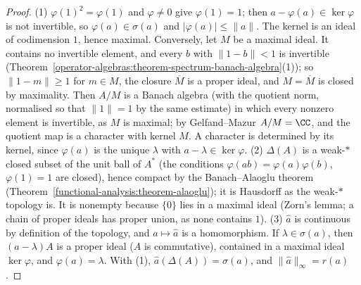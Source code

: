 \begin{proof}
(1) $\varphi(1)^2 = \varphi(1)$ and $\varphi \neq 0$ give $\varphi(1) = 1$; then $a - \varphi(a) \in \ker\varphi$ is not invertible, so $\varphi(a) \in \sigma(a)$ and $|\varphi(a)| \leq \|a\|$. The kernel is an ideal of codimension $1$,
hence maximal. Conversely, let $M$ be a maximal ideal. It contains no invertible element, and every $b$ with $\|1 - b\| < 1$ is invertible
(Theorem~\ref{operator-algebras:theorem-spectrum-banach-algebra}(1)); so $\|1 - m\| \geq 1$ for $m \in M$, the closure $\overline{M}$ is a proper ideal, and $M = \overline{M}$ is closed by maximality. Then $A/M$ is a Banach algebra (with the quotient norm, normalised so that
$\|1\| = 1$ by the same estimate) in which every nonzero element is invertible, as $M$ is maximal; by Gelfand--Mazur $A/M = \CC$, and the quotient map is a character with kernel $M$. A character is determined by its
kernel, since $\varphi(a)$ is the unique $\lambda$ with $a - \lambda \in \ker\varphi$.
(2) $\Delta(A)$ is a weak-$*$ closed subset of the unit ball of $A^*$ (the conditions $\varphi(ab) = \varphi(a)\varphi(b)$, $\varphi(1) = 1$ are closed), hence compact by the Banach--Alaoglu theorem
(Theorem~\ref{functional-analysis:theorem-alaoglu}); it is Hausdorff as the weak-$*$ topology is. It is nonempty because $\{0\}$ lies in a maximal ideal (Zorn's lemma; a chain of proper ideals has proper union, as none
contains $1$).
(3) $\hat a$ is continuous by definition of the topology, and $a \mapsto \hat a$ is a homomorphism. If $\lambda \in \sigma(a)$, then $(a - \lambda)A$ is a proper ideal ($A$ is commutative), contained in a maximal ideal
$\ker\varphi$, and $\varphi(a) = \lambda$. With (1), $\hat a(\Delta(A)) = \sigma(a)$, and $\|\hat a\|_\infty = r(a)$.
\end{proof}

